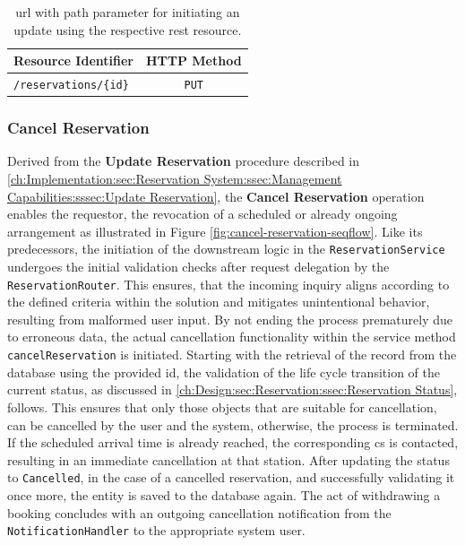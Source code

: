 \begingroup
\setlength{\tabcolsep}{10pt} %
\renewcommand{\arraystretch}{1.5} %
\begin{table}[h]
\centering
\caption{\acrshort{url} with path parameter for initiating an update using the respective \acrshort{rest} resource.}
    \begin{tabular}{l|c}
    Resource Identifier & HTTP Method \\ \hline
    \texttt{/reservations/\{id\}} & \texttt{PUT}
    \end{tabular}
\label{tab:update-reservation-rest}
\end{table}
\endgroup

\newpage

\subsubsection{Cancel Reservation}
\label{ch:Implementation:sec:Reservation System:ssec:Management Capabilities:sssec:Cancel Reservation}

Derived from the \textbf{Update Reservation} procedure described in \ref{ch:Implementation:sec:Reservation System:ssec:Management Capabilities:sssec:Update Reservation}, the \textbf{Cancel Reservation} operation enables the requestor, the revocation of a scheduled or already ongoing arrangement as illustrated in Figure \ref{fig:cancel-reservation-seqflow}.
Like its predecessors, the initiation of the downstream logic in the \texttt{ReservationService} undergoes the initial validation checks after request delegation by the \texttt{ReservationRouter}.
This ensures, that the incoming inquiry aligns according to the defined criteria within the solution and mitigates unintentional behavior, resulting from malformed user input.
By not ending the process prematurely due to erroneous data, the actual cancellation functionality within the service method \texttt{cancelReservation} is initiated.
Starting with the retrieval of the record from the database using the provided \acrshort{id}, the validation of the life cycle transition of the current status, as discussed in \ref{ch:Design:sec:Reservation:ssec:Reservation Status}, follows.
This ensures that only those objects that are suitable for cancellation, can be cancelled by the user and the system, otherwise, the process is terminated.
If the scheduled arrival time is already reached, the corresponding \acrshort{cs} is contacted, resulting in an immediate cancellation at that station.
After updating the status to \texttt{Cancelled}, in the case of a cancelled reservation, and successfully validating it once more, the entity is saved to the database again. The act of withdrawing a booking concludes with an outgoing cancellation notification from the \texttt{NotificationHandler} to the appropriate system user.

